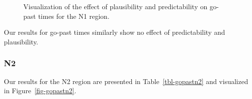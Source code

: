\documentclass[
  letterpaper,
  DIV=11,
  numbers=noendperiod,
  nottoc,
  oneside]{scrreprt}
\begin{document}
\begin{figure}


\caption{\label{fig-gopastn1}Visualization of the effect of plausibility
and predictability on go-past times for the N1 region.}

\end{figure}%

Our results for go-past times similarly show no effect of predictability
and plausibility.

\subsubsection{N2}\label{n2-2}

Our results for the N2 region are presented in Table~\ref{tbl-gopastn2}
and visualized in Figure~\ref{fig-gopastn2}.
\end{document}
